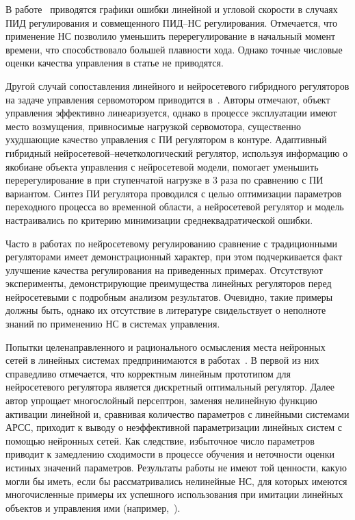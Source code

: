 В работе~\cite{boquete99} приводятся графики ошибки линейной и угловой
скорости в случаях ПИД регулирования и совмещенного ПИД--НС
регулирования.  Отмечается, что применение НС позволило уменьшить
перерегулирование в начальный момент времени, что способствовало
большей плавности хода.  Однако точные числовые оценки качества
управления в статье не приводятся.

Другой случай сопоставления линейного и нейросетевого гибридного
регуляторов на задаче управления сервомотором приводится
в~\cite{wailinlin00}.  Авторы отмечают, объект управления эффективно
линеаризуется, однако в процессе эксплуатации имеют место возмущения,
привносимые нагрузкой сервомотора, существенно ухудшающие качество
управления с ПИ регулятором в контуре.  Адаптивный гибридный
нейросетевой--не\-чет\-ко\-ло\-ги\-че\-ский регулятор, используя информацию о
якобиане объекта управления с нейросетевой модели, помогает уменьшить
перерегулирование в при ступенчатой нагрузке в 3 раза по сравнению с
ПИ вариантом.  Синтез ПИ регулятора проводился с целью оптимизации
параметров переходного процесса во временной области, а нейросетевой
регулятор и модель настраивались по критерию минимизации
среднеквадратической ошибки.

Часто в работах по нейросетевому регулированию сравнение с
традиционными регуляторами имеет демонстрационный характер, при этом
подчеркивается факт улучшение качества регулирования на приведенных
примерах.  Отсутствуют эксперименты, демонстрирующие преимущества
линейных регуляторов перед нейросетевыми с подробным анализом
результатов.  Очевидно, такие примеры должны быть, однако их
отсутствие в литературе свидельствует о неполноте знаний по применению
НС в системах управления.

Попытки целенаправленного и рационального осмысления места нейронных
сетей в линейных системах предпринимаются в
работах~\cite{warwick96,toudeft}.  В первой из них справедливо
отмечается, что корректным линейным прототипом для нейросетевого
регулятора является дискретный оптимальный регулятор.  Далее автор
упрощает многослойный персептрон, заменяя нелинейную функцию активации
линейной и, сравнивая количество параметров с линейными системами
АРСС, приходит к выводу о неэффективной параметризации линейных систем
с помощью нейронных сетей.  Как следствие, избыточное число параметров
приводит к замедлению сходимости в процессе обучения и неточности
оценки истиных значений параметров.  Результаты работы не имеют той
ценности, какую могли бы иметь, если бы рассматривались нелинейные НС,
для которых имеются многочисленные примеры их успешного использования
при имитации линейных объектов и управления ими
(например,~\cite{khomyu96,wailinlin00,elfil-pta99}).

